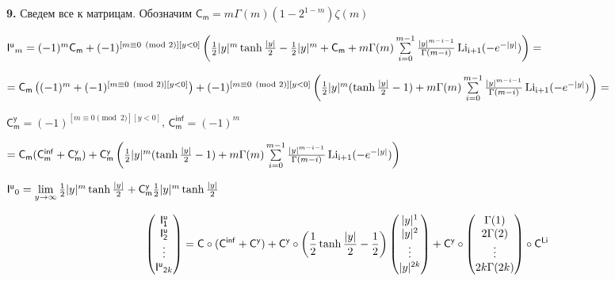 \documentclass[a4paper,12pt]{article}
\begin{document}
\noindent\textbf{9.} Сведем все к матрицам. Обозначим $\mathsf{C_m} = m \Gamma(m)(1 - 2^{1 - m})\zeta(m)$

\begin{center}
    $\mathsf{I^u}_m = (-1)^m \mathsf{C_m} + (-1)^{[m \equiv 0 \pmod{2}][y < 0]} \left({1\over{2}}|y|^m \operatorname{tanh}{|y|\over{2}} - {1\over{2}}|y|^m + \mathsf{C_m} + m\Gamma(m)\sum\limits_{i = 0}^{m - 1} {|y|^{m - i - 1}\over{\Gamma(m - i)}} \operatorname{Li_{i + 1}}(-e^{-|y|})\right) =$
\end{center}

\begin{center}
    $= \mathsf{C_m} \left((-1)^m + (-1)^{[m \equiv 0 \pmod{2}][y < 0]}\right)  + (-1)^{[m \equiv 0 \pmod{2}][y < 0]} \left({1\over{2}}|y|^m (\operatorname{tanh}{|y|\over{2}} - 1) + m \Gamma(m)\sum\limits_{i = 0}^{m - 1} {|y|^{m - i - 1}\over{\Gamma(m - i)}} \operatorname{Li_{i + 1}}(-e^{-|y|})\right) =$
\end{center}

 $\mathsf{C_m^{y}} = (-1)^{[m \equiv 0 \pmod{2}][y < 0]}$, $\mathsf{C_m^{inf}} = (-1)^m$

\begin{center}
    $= \mathsf{C_m} (\mathsf{C_m^{inf}}+ \mathsf{C_m^{y}})  + \mathsf{C_m^{y}} \left({1\over{2}}|y|^m (\operatorname{tanh}{|y|\over{2}} - 1) + m \Gamma(m)\sum\limits_{i = 0}^{m - 1} {|y|^{m - i - 1}\over{\Gamma(m - i)}} \operatorname{Li_{i + 1}}(-e^{-|y|})\right)$
\end{center}

\begin{center}
    $\mathsf{I^u}_0 = \lim\limits_{y\rightarrow \infty} {1\over{2}}|y|^m \operatorname{tanh}{|y|\over{2}} + \mathsf{C_m^{y}}  {1\over{2}}|y|^m \operatorname{tanh}{|y|\over{2}}$
\end{center}

\begin{displaymath}
    \begin{pmatrix}
        \mathsf{I^u_1} \\ \mathsf{I^u_2} \\ \vdots \\ \mathsf{I^u}_{\mathsf{2}k} \\
    \end{pmatrix} = \mathsf{C} \circ (\mathsf{C^{inf}} + \mathsf{C^y}) + \mathsf{C^y} \circ \left({1\over{2}}\operatorname{tanh}{|y|\over{2}} - {1\over{2}}\right) \begin{pmatrix}
        |y|^1 \\ |y|^2 \\ \vdots \\ |y|^{\mathsf{2}k} \\
    \end{pmatrix} + \mathsf{C^y} \circ \begin{pmatrix}
        \Gamma(1) \\ 2\Gamma(2) \\ \vdots \\ 2k\Gamma(2k) \\
    \end{pmatrix} \circ \mathsf{C^{Li}} 
\end{displaymath}
\end{document}
